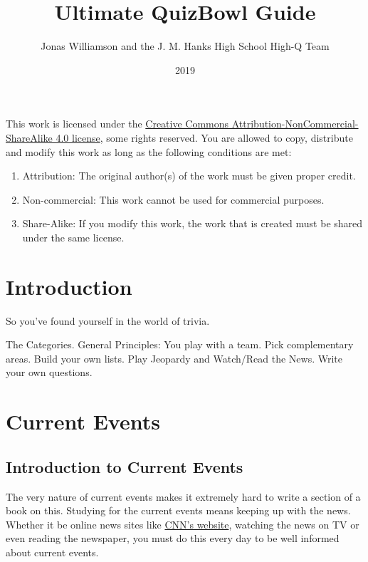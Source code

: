 \documentclass[12pt]{book}
\begin{document}
	\frontmatter
	\title{Ultimate QuizBowl Guide}
	\author{Jonas Williamson and the  J. M. Hanks High School High-Q Team}
	\date{2019}
	\maketitle
	\begin{center}

			\huge \cc \the\year
			\vspace{0.5 in}
			
			\byncsa
	\normalsize
		\end{center}
		\vspace{2 in}	
	This work is licensed under the \href{https://creativecommons.org/licenses/by-nc-sa/4.0/legalcode}{Creative Commons Attribution-NonCommercial-ShareAlike 4.0 license}, some rights reserved.  You are allowed to copy, distribute and modify this work as long as the following conditions are met:
	\begin{enumerate}
		\item Attribution: The original author(s) of the work must be given proper credit.
		\item Non-commercial: This work cannot be used for commercial purposes.
		\item Share-Alike: If you modify this work, the work that is created must be shared under the same license. 
	\end{enumerate}


	
	
	
	
	
	
	\tableofcontents

	\mainmatter
	
	
\chapter{Introduction}
So you've found yourself in the world of trivia.  

The Categories.
General Principles: You play with a team.  Pick complementary areas.  Build your own lists.  Play Jeopardy and Watch/Read the News.  Write your own questions.

\chapter{Current Events}
	\section{Introduction to Current Events}
		The very nature of current events makes it extremely hard to write a section of a book on this.  Studying for the current events means keeping up with the news.  Whether it be online news sites like \href{http://www.cnn.com}{CNN's website}, watching the news on TV or even reading the newspaper, you must do this every day to be well informed about current events.  
		
\end{document}

